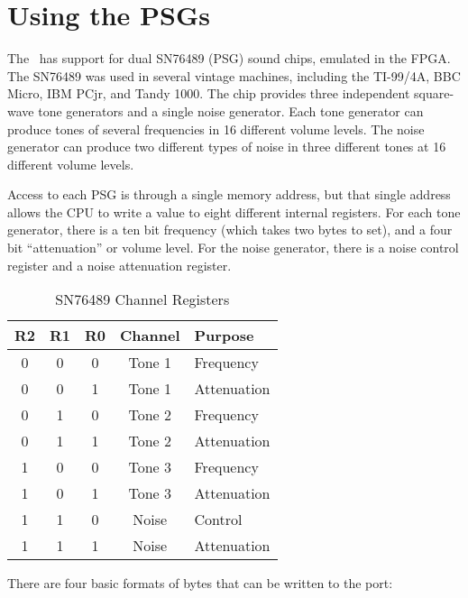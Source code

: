 \section{Using the PSGs}

The \jr\ has support for dual SN76489 (PSG) sound chips, emulated in the FPGA. The SN76489 was used in several vintage machines, including the TI-99/4A, BBC Micro, IBM PCjr, and Tandy 1000. The chip provides three independent square-wave tone generators and a single noise generator. Each tone generator can produce tones of several frequencies in 16 different volume levels. The noise generator can produce two different types of noise in three different tones at 16 different volume levels.

Access to each PSG is through a single memory address, but that single address allows the CPU to write a value to eight different internal registers. For each tone generator, there is a ten bit frequency (which takes two bytes to set), and a four bit ``attenuation'' or volume level. For the noise generator, there is a noise control register and a noise attenuation register.

\begin{table}[h]
	\begin{center}
		\begin{tabular}{|c|c|c|c|l|} \hline
			R2 & R1 & R0 & Channel & Purpose \\ \hline \hline
			0 & 0 & 0 & Tone 1 & Frequency \\ \hline
			0 & 0 & 1 & Tone 1 & Attenuation \\ \hline
			0 & 1 & 0 & Tone 2 & Frequency \\ \hline
			0 & 1 & 1 & Tone 2 & Attenuation \\ \hline
			1 & 0 & 0 & Tone 3 & Frequency \\ \hline
			1 & 0 & 1 & Tone 3 & Attenuation \\ \hline
			1 & 1 & 0 & Noise & Control \\ \hline
			1 & 1 & 1 & Noise & Attenuation \\ \hline
		\end{tabular}
		\caption{SN76489 Channel Registers}
	\end{center}
	\label{tab:psg_registers}
\end{table}

There are four basic formats of bytes that can be written to the port:

